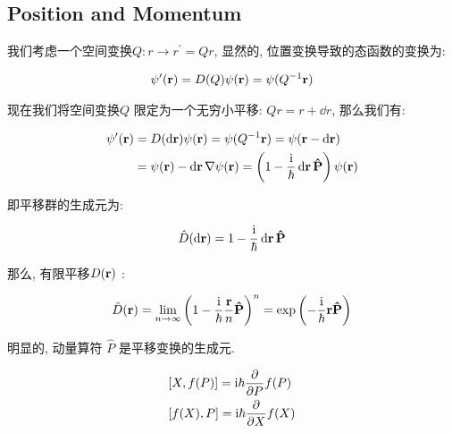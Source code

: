 \subsection{Position and Momentum}

我们考虑一个空间变换$Q:r\to r^\prime = Qr$, 显然的, 位置变换导致的态函数的变换为:

\begin{equation}
  \begin{aligned}
    \psi^{\prime}({\bf r}) = D(Q) \psi({\bf r}) = \psi(Q^{-1} {\bf r})
  \end{aligned}
\end{equation}

现在我们将空间变换$Q$ 限定为一个无穷小平移: $Qr = r+\dd r$, 那么我们有:

\begin{equation}
  \begin{aligned}
    \psi^{\prime}({\bf r}) &= D(\dd {\bf r}) \psi({\bf r}) = \psi(Q^{-1} {\bf r}) = \psi({\bf r} - \dd {\bf r}) \\
    &= \psi({\bf r}) - \dd {\bf r} \nabla \psi({\bf r}) = \left(1 - \frac{{\rm i}}{\hbar}\dd {\bf r} {\bf \hat{P}}\right)\psi({\bf r})
  \end{aligned}
\end{equation}

即平移群的生成元为:

\begin{equation}
  \begin{aligned}
    \hat{D}(\dd{\bf r}) = 1 - \frac{{\rm i}}{\hbar}\dd {\bf r} {\bf \hat{P}}
  \end{aligned}
\end{equation}

那么, 有限平移$D({\bf r})$ :

\begin{equation}
  \begin{aligned}
    \hat{D}({\bf r}) = \lim_{n\to \infty} \left(1 - \frac{{\rm i}}{\hbar} \frac{{\bf r}}{n} {\bf \hat{P}}\right)^{n} = \exp \left(- \frac{{\rm i}}{\hbar}{\bf r}{\bf \hat{P}}\right)
  \end{aligned}
\end{equation}

明显的, 动量算符 $\hat{P}$ 是平移变换的生成元.

\begin{theorem}
  \begin{equation}
    \begin{aligned}
      &[X,f(P)] = {\rm i} \hbar  \pdv{}{P} f(P)\\
      &[f(X), P] = {\rm i} \hbar \pdv{}{X} f(X)
    \end{aligned}
  \end{equation}
\end{theorem}
